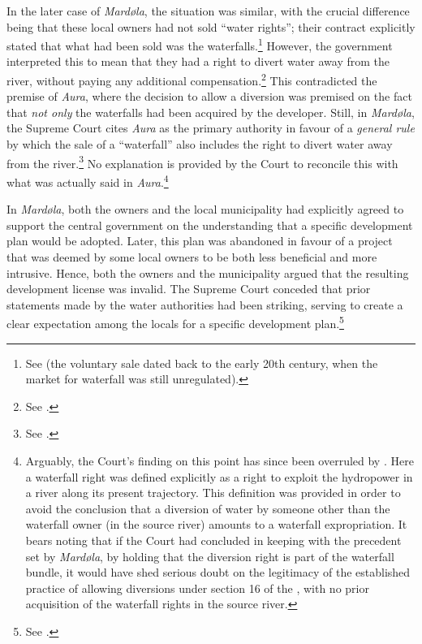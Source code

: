 In the later case of {\it Mardøla}, the situation was similar, with the crucial difference being that these local owners had not sold ``water rights''; their contract explicitly stated that what had been sold was the waterfalls.\footnote{See \cite[112]{mardola73} (the voluntary sale dated back to the early 20th century, when the market for waterfall was still unregulated).} However, the government interpreted this to mean that they had a right to divert water away from the river, without paying any additional compensation.\footnote{See \cite[112]{mardola73}.} This contradicted the premise of {\it Aura}, where the decision to allow a diversion was premised on the fact that {\it not only} the waterfalls had been acquired by the developer. Still, in {\it Mardøla}, the Supreme Court cites {\it Aura} as the primary authority in favour of a {\it general rule} by which the sale of a ``waterfall'' also includes the right to divert water away from the river.\footnote{See \cite[112]{mardola73}.} No explanation is provided by the Court to reconcile this with what was actually said in {\it Aura}.\footnote{Arguably, the Court's finding on this point has since been overruled by \cite{jorpeland11}. Here a waterfall right was defined explicitly as a right to exploit the hydropower in a river along its present trajectory. This definition was provided in order to avoid the conclusion that a diversion of water by someone other than the waterfall owner (in the source river) amounts to a waterfall expropriation. It bears noting that if the Court had concluded in keeping with the precedent set by {\it Mardøla}, by holding that the diversion right is part of the waterfall bundle, it would have shed serious doubt on the legitimacy of the established practice of allowing diversions under section 16 of the \cite{wra17}, with no prior acquisition of the waterfall rights in the source river.}

In {\it Mardøla}, both the owners and the local municipality had explicitly agreed to support the central government on the understanding that a specific development plan would be adopted. Later, this plan was abandoned in favour of a project that was deemed by some local owners to be both less beneficial and more intrusive. Hence, both the owners and the municipality argued that the resulting development license was invalid. The Supreme Court conceded that prior statements made by the water authorities had been striking, serving to create a clear expectation among the locals for a specific development plan.\footnote{See \cite[111]{mardola73}.}

